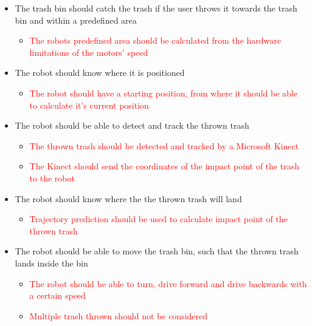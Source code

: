 \begin{itemize}
\item The trash bin should catch the trash if the user throws it towards the trash bin and within a predefined area
\begin{itemize}
\item \textcolor{red}{The robots predefined area should be calculated from the hardware limitations of the motors’ speed}
\end{itemize}
\item The robot should know where it is positioned
\begin{itemize}
\item \textcolor{red}{The robot should have a starting position, from where it should be able to calculate it's current position }
\end{itemize}
\item The robot should be able to detect and track the thrown trash
\begin{itemize}
\item \textcolor{red}{The thrown trash should be detected and tracked by a Microsoft Kinect}
\item \textcolor{red}{The Kinect should send the coordinates of the impact point of the trash to the robot}
\end{itemize}
\item The robot should know where the the thrown trash will land
\begin{itemize}
\item \textcolor{red}{Trajectory prediction should be used to calculate impact point of the thrown trash}
\end{itemize}
\item The robot should be able to move the trash bin, such that the thrown trash lands inside the bin
\begin{itemize}
\item \textcolor{red}{The robot should be able to turn, drive forward and drive backwards with a certain speed}
\item \textcolor{red}{Multiple trash thrown should not be considered}
\end{itemize}
\end{itemize}
